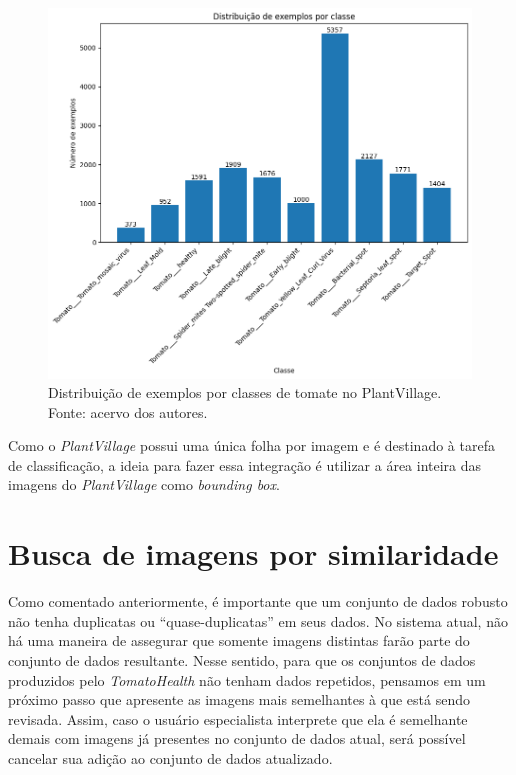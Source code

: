 \begin{figure}[H]
    \centering
    \includegraphics[width=0.9\linewidth]{images/plant_village_distribution.png}
    \caption{\label{fig:distribuicao_plantvillage} Distribuição de exemplos por classes de tomate no PlantVillage. Fonte: acervo dos autores.}
\end{figure}

Como o \emph{PlantVillage} possui uma única folha por imagem e é destinado à tarefa de classificação, a ideia para fazer essa integração é utilizar a área inteira das imagens do \emph{PlantVillage} como \emph{bounding box}.

\section{Busca de imagens por similaridade}
Como comentado anteriormente, é importante que um conjunto de dados robusto não tenha duplicatas ou ``quase-duplicatas'' em seus dados. No sistema atual, não há uma maneira de assegurar que somente imagens distintas farão parte do conjunto de dados resultante. Nesse sentido, para que os conjuntos de dados produzidos pelo \emph{TomatoHealth} não tenham dados repetidos, pensamos em um próximo passo que apresente as imagens mais semelhantes à que está sendo revisada. Assim, caso o usuário especialista interprete que ela é semelhante demais com imagens já presentes no conjunto de dados atual, será possível cancelar sua adição ao conjunto de dados atualizado.

